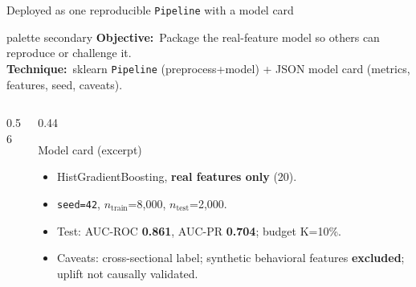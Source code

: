 \documentclass[11pt,aspectratio=169]{beamer}
\newcommand{\aimtech}[2]{%
  \begin{beamercolorbox}[wd=\textwidth,sep=5pt,rounded=true]{palette secondary}
    \footnotesize\textbf{Objective:}~#1\\[1pt]\textbf{Technique:}~#2
  \end{beamercolorbox}\vspace{3pt}%
}
\begin{document}
\begin{frame}{Deployed as one reproducible \texttt{Pipeline} with a model card}
  \aimtech{Package the real-feature model so others can reproduce or challenge it.}%
          {sklearn \texttt{Pipeline} (preprocess+model) + JSON model card (metrics, features, seed, caveats).}
  \begin{columns}[T]
    \begin{column}{0.56\textwidth}
      \centering
    \end{column}
    \begin{column}{0.44\textwidth}
      \begin{block}{\small Model card (excerpt)}
        \footnotesize
        \begin{itemize}
          \item HistGradientBoosting, \textbf{real features only} (20).
          \item \texttt{seed=42}, \(n_{\text{train}}\)=8{,}000, \(n_{\text{test}}\)=2{,}000.
          \item Test: AUC-ROC \textbf{0.861}, AUC-PR \textbf{0.704}; budget K=10\%.
          \item Caveats: cross-sectional label; synthetic behavioral features \textbf{excluded}; uplift not causally validated.
        \end{itemize}
      \end{block}
    \end{column}
  \end{columns}
\end{frame}
\end{document}
